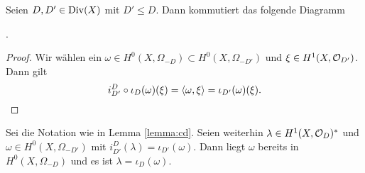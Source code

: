 \begin{lemma}
  \label{lemma:cd}
  Seien $D, D' \in \operatorname{Div}(X)$ mit $D' \leq D$. Dann kommutiert das
  folgende Diagramm
  \begin{center}
    .
  \end{center}
\end{lemma}

\begin{proof}
  Wir wählen ein $\omega \in H^0(X, \Omega_{-D}) \subset H^0(X,
  \Omega_{-D'})$ und $\xi \in H^1(X, \mathcal{O}_{D'})$. Dann gilt
  \[
  i_{D'}^D \circ \iota_D(\omega)(\xi) = \langle \omega, \xi \rangle =
  \iota_{D'}(\omega)(\xi).
  \]
\end{proof}

\begin{lemma}
  \label{lemma:urbilder}
  Sei die Notation wie in Lemma \ref{lemma:cd}. Seien weiterhin
  $\lambda \in H^1(X, \mathcal{O}_D)^\ast$ und $\omega \in H^0(X,
  \Omega_{-D'})$ mit $i_{D'}^D(\lambda) = \iota_{D'}(\omega)$. Dann
  liegt $\omega$ bereits in $H^0(X, \Omega_{-D})$ und es ist $\lambda =
  \iota_D (\omega)$.
\end{lemma}


